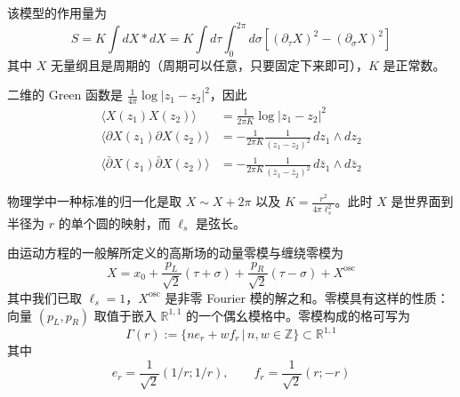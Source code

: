 该模型的作用量为
\begin{equation}
  S=K\int dX*dX=K\int d\tau\int_0^{2\pi}d\sigma\left[(\partial_\tau X)^2-(\partial_\sigma X)^2\right]
  \tag{2.307}
  \label{eq:2.307}
\end{equation}
其中 $X$ 无量纲且是周期的（周期可以任意，只要固定下来即可），$K$ 是正常数。

二维的 Green 函数是 $\frac{1}{4\pi}\log|z_1-z_2|^2$，因此
\begin{equation}
  \begin{aligned}
    \langle X(z_1)X(z_2)\rangle&=\frac{1}{2\pi K}\log|z_1-z_2|^2\\
    \langle\partial X(z_1)\partial X(z_2)\rangle&=-\frac{1}{2\pi K}\frac{1}{(z_1-z_2)^2}\,dz_1\wedge dz_2\\
    \langle\bar\partial X(z_1)\bar\partial X(z_2)\rangle&=-\frac{1}{2\pi K}\frac{1}{(\bar z_1-\bar z_2)^2}\,d\bar z_1\wedge d\bar z_2
  \end{aligned}
  \tag{2.308}
  \label{eq:2.308}
\end{equation}

物理学中一种标准的归一化是取 $X\sim X+2\pi$ 以及 $K=\frac{r^2}{4\pi\ell_s^2}$。此时 $X$ 是世界面到半径为 $r$ 的单个圆的映射，而 $\ell_s$ 是弦长。

由运动方程的一般解所定义的高斯场的动量零模与缠绕零模为
\begin{equation}
  X=x_0+\frac{p_L}{\sqrt2}(\tau+\sigma)+\frac{p_R}{\sqrt2}(\tau-\sigma)+X^{\mathrm{osc}}
  \tag{2.309}
  \label{eq:2.309}
\end{equation}
其中我们已取 $\ell_s=1$，$X^{\mathrm{osc}}$ 是非零 Fourier 模的解之和。零模具有这样的性质：向量 $(p_L,p_R)$ 取值于嵌入 $\mathbb{R}^{1,1}$ 的一个偶幺模格中。零模构成的格可写为
\begin{equation}
  \Gamma(r):=\{ne_r+wf_r\,|\,n,w\in\mathbb{Z}\}\subset\mathbb{R}^{1,1}
  \tag{2.310}
  \label{eq:2.310}
\end{equation}
其中
\begin{equation}
  e_r=\frac{1}{\sqrt2}(1/r;1/r),\qquad f_r=\frac{1}{\sqrt2}(r;-r)
  \tag{2.311}
  \label{eq:2.311}
\end{equation}

